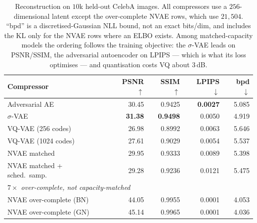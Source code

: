 \documentclass[sigconf,nonacm]{acmart}
\newcommand{\best}[1]{\textbf{#1}}
\begin{document}
\begin{table}[t]
\caption{Reconstruction on $10$k held-out CelebA images. All compressors use a
$256$-dimensional latent except the over-complete NVAE rows, which use
$21{,}504$. ``bpd'' is a discretised-Gaussian NLL bound, not an exact bits/dim,
and includes the KL only for the NVAE rows where an ELBO exists. Among
matched-capacity models the ordering follows the training objective: the
$\sigma$-VAE leads on PSNR/SSIM, the adversarial autoencoder on LPIPS --- which
is what its loss optimises --- and quantisation costs VQ about $3$\,dB.}
\label{tab:recon}
\small
\begin{tabular}{lrrrr}
\toprule
Compressor & PSNR $\uparrow$ & SSIM $\uparrow$ & LPIPS $\downarrow$ & bpd $\downarrow$ \\
\midrule
Adversarial AE            & 30.45 & 0.9425 & \best{0.0027} & 5.085 \\
$\sigma$-VAE              & \best{31.38} & \best{0.9498} & 0.0050 & 4.919 \\
VQ-VAE (256 codes)        & 26.98 & 0.8992 & 0.0063 & 5.646 \\
VQ-VAE (1024 codes)       & 27.61 & 0.9029 & 0.0054 & 5.537 \\
NVAE matched              & 29.95 & 0.9333 & 0.0089 & 5.398 \\
NVAE matched + sched.\ samp.\ & 29.28 & 0.9236 & 0.0121 & 5.475 \\
\midrule
\multicolumn{5}{l}{\emph{$7\times$ over-complete, not capacity-matched}}\\
NVAE over-complete (BN)   & 44.05 & 0.9955 & 0.0001 & 4.053 \\
NVAE over-complete (GN)   & 45.14 & 0.9965 & 0.0001 & 4.036 \\
\bottomrule
\end{tabular}
\end{table}
\end{document}
